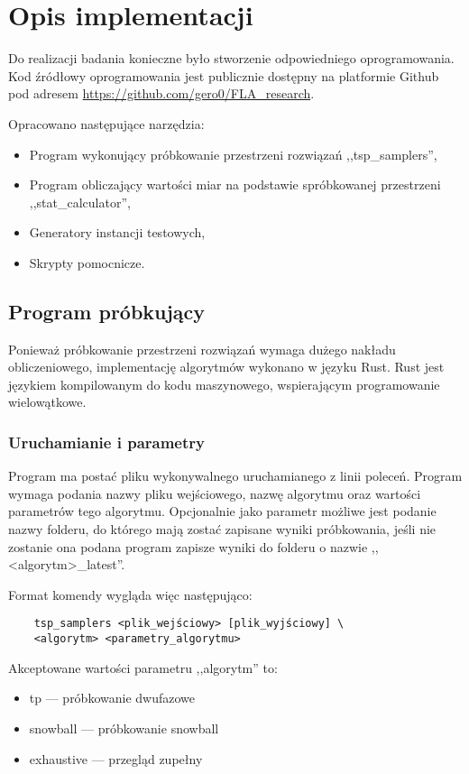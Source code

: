 \chapter{Opis implementacji}
Do realizacji badania konieczne było stworzenie odpowiedniego oprogramowania.
Kod źródłowy oprogramowania jest publicznie dostępny na platformie Github pod adresem
\url{https://github.com/gero0/FLA_research}.

Opracowano następujące narzędzia:
\begin{itemize}
    \item Program wykonujący próbkowanie przestrzeni rozwiązań ,,tsp\_samplers'',
    \item Program obliczający wartości miar na podstawie spróbkowanej przestrzeni ,,stat\_calculator'',
    \item Generatory instancji testowych,
    \item Skrypty pomocnicze.
\end{itemize}

\section{Program próbkujący}
Ponieważ próbkowanie przestrzeni rozwiązań wymaga dużego nakładu obliczeniowego,
implementację algorytmów wykonano w języku Rust.
Rust jest językiem kompilowanym do kodu maszynowego, wspierającym programowanie wielowątkowe.

\subsection{Uruchamianie i parametry}

Program ma postać pliku wykonywalnego uruchamianego z linii poleceń.
Program wymaga podania nazwy pliku wejściowego, nazwę algorytmu oraz wartości parametrów tego algorytmu.
Opcjonalnie jako parametr możliwe jest podanie nazwy folderu, do którego mają zostać zapisane wyniki próbkowania,
jeśli nie zostanie ona podana program zapisze wyniki do folderu o nazwie ,,<algorytm>\_latest''.

Format komendy wygląda więc następująco:
\begin{lstlisting}
    tsp_samplers <plik_wejściowy> [plik_wyjściowy] \
    <algorytm> <parametry_algorytmu>
\end{lstlisting}


Akceptowane wartości parametru ,,algorytm'' to:
\begin{itemize}
    \item tp --- próbkowanie dwufazowe
    \item snowball --- próbkowanie snowball
    \item exhaustive --- przegląd zupełny
\end{itemize}

